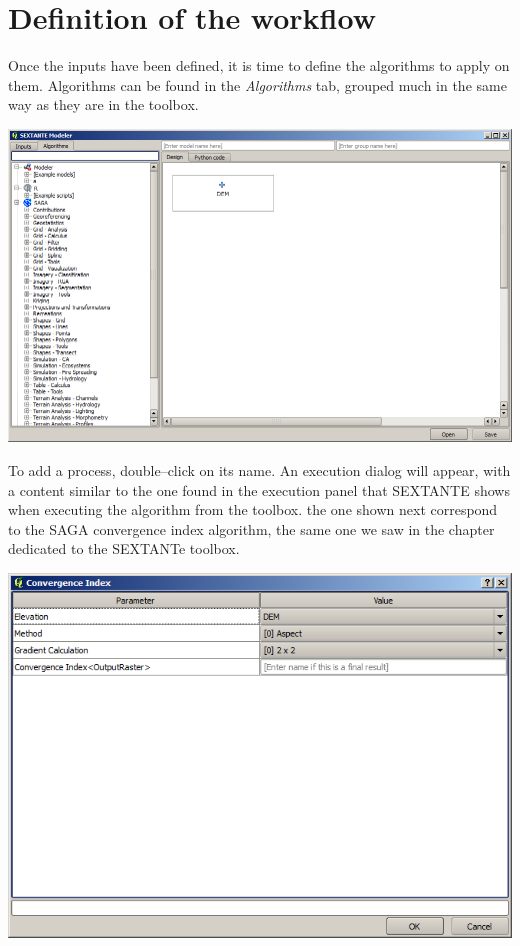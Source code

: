 \section{Definition of the workflow}

Once the inputs have been defined, it is time to define the algorithms to apply on them. Algorithms can be found in the \emph{Algorithms} tab, grouped much in the same way as they are in the toolbox.

\begin{center}
\includegraphics[width=.8\columnwidth]{models_parameters3.png}
\end{center}

To add a process, double--click on its name. An execution dialog will appear, with a content similar to the one found in the execution panel that SEXTANTE shows when executing the algorithm from the toolbox. the one shown next correspond to the SAGA convergence index algorithm, the same one we saw in the chapter dedicated to the SEXTANTe toolbox.

\begin{center}
\includegraphics[width=.8\columnwidth]{models_parameters4.png}
\end{center}

